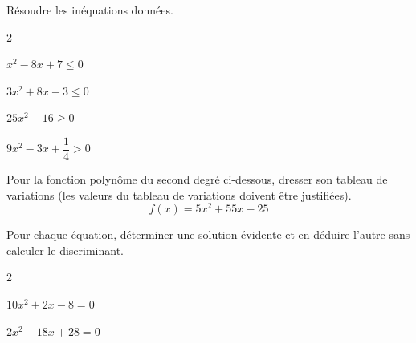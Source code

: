 \documentclass[12pt,a4paper]{article}  %
\begin{document}
\vspace{-0.3cm}

Résoudre les inéquations données.
\begin{multicols}{2}
\begin{enumMet}
    \item {} $x^{2}-8 x+7 \leqslant 0$
    \item $3 x^{2}+8 x-3 \leqslant 0$
    \item $25 x^{2}-16 \geqslant 0$
    \item $9 x^{2}-3x+\dfrac{1}{4}>0$
\end{enumMet}
\end{multicols}

\vspace{-0.3cm}
Pour la fonction polynôme du second degré ci-dessous, dresser son tableau de variations (les valeurs du tableau de variations doivent être justifiées).
$$f(x)=5x^2+55x-25$$

\vspace{-0.3cm}

Pour chaque équation, déterminer une solution évidente et en déduire l'autre sans calculer le discriminant.
\begin{multicols}{2}
\begin{enumMet}
    \item $10x^2+2x-8=0$
    \item $2x^2-18x+28=0$
\end{enumMet}
\end{multicols}

\newpage




\end{document}
